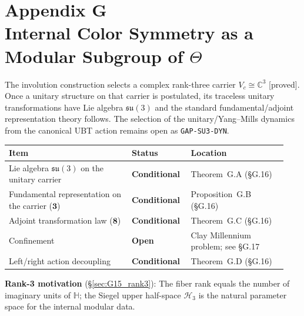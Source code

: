 

\appendix
\section*{Appendix G \\ Internal Color Symmetry as a Modular Subgroup of \texorpdfstring{$\Theta$}{Theta}}
\label{app:color_internal_symmetry}

\begin{tcolorbox}[colback=yellow!7!white,colframe=orange!70!black,title=Status: Carrier proved; unitary color dynamics conditional]
The involution construction selects a complex rank-three carrier
$V_c\cong\mathbb{C}^3$ [proved].  Once a unitary structure on that carrier is
postulated, its traceless unitary transformations have Lie algebra
$\mathfrak{su}(3)$ and the standard fundamental/adjoint representation theory
follows.  The selection of the unitary/Yang--Mills dynamics from the canonical
UBT action remains open as \texttt{GAP-SU3-DYN}.

\medskip
\begin{tabular}{@{}p{0.42\linewidth}p{0.19\linewidth}p{0.33\linewidth}@{}}
\hline
Item & Status & Location \\
\hline
Lie algebra $\mathfrak{su}(3)$ on the unitary carrier & \textbf{Conditional} & Theorem~G.A (\S G.16) \\
Fundamental representation on the carrier ($\mathbf{3}$) & \textbf{Conditional} & Proposition~G.B (\S G.16) \\
Adjoint transformation law ($\mathbf{8}$) & \textbf{Conditional} & Theorem~G.C (\S G.16) \\
Confinement & \textbf{Open} & Clay Millennium problem; see \S G.17 \\
Left/right action decoupling & \textbf{Conditional} & Theorem~G.D (\S G.16) \\
\hline
\end{tabular}

\medskip
\textbf{Rank-3 motivation} (\S\ref{sec:G15_rank3}): The fiber rank equals the number of imaginary units of $\mathbb{H}$; the Siegel upper half-space $\mathcal{H}_3$ is the natural parameter space for the internal modular data.
\end{tcolorbox}


